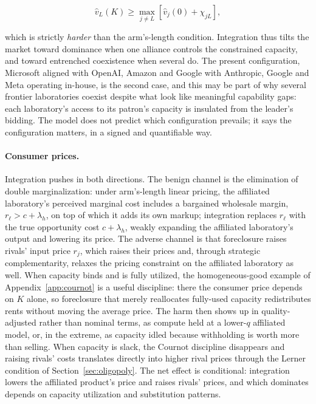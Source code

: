 \documentclass[11pt]{article}
\begin{document}
\begin{equation}\widehat v_L(K)\geq\max_{j\neq L}\left[\widehat v_j(0)+\chi_{jL}\right],\end{equation}

which is strictly \emph{harder} than the arm's-length condition. Integration thus tilts the market toward dominance when one alliance controls the constrained capacity, and toward entrenched coexistence when several do. The present configuration, Microsoft aligned with OpenAI, Amazon and Google with Anthropic, Google and Meta operating in-house, is the second case, and this may be part of why several frontier laboratories coexist despite what look like meaningful capability gaps: each laboratory's access to its patron's capacity is insulated from the leader's bidding. The model does not predict which configuration prevails; it says the configuration matters, in a signed and quantifiable way.

\paragraph{Consumer prices.} Integration pushes in both directions. The benign channel is the elimination of double marginalization: under arm's-length linear pricing, the affiliated laboratory's perceived marginal cost includes a bargained wholesale margin, $r_\ell>c+\lambda_h$, on top of which it adds its own markup; integration replaces $r_\ell$ with the true opportunity cost $c+\lambda_h$, weakly expanding the affiliated laboratory's output and lowering its price. The adverse channel is that foreclosure raises rivals' input price $r_j$, which raises their prices and, through strategic complementarity, relaxes the pricing constraint on the affiliated laboratory as well. When capacity binds and is fully utilized, the homogeneous-good example of Appendix~\ref{app:cournot} is a useful discipline: there the consumer price depends on $K$ alone, so foreclosure that merely reallocates fully-used capacity redistributes rents without moving the average price. The harm then shows up in quality-adjusted rather than nominal terms, as compute held at a lower-$q$ affiliated model, or, in the extreme, as capacity idled because withholding is worth more than selling. When capacity is slack, the Cournot discipline disappears and raising rivals' costs translates directly into higher rival prices through the Lerner condition of Section~\ref{sec:oligopoly}. The net effect is conditional: integration lowers the affiliated product's price and raises rivals' prices, and which dominates depends on capacity utilization and substitution patterns.
\end{document}
